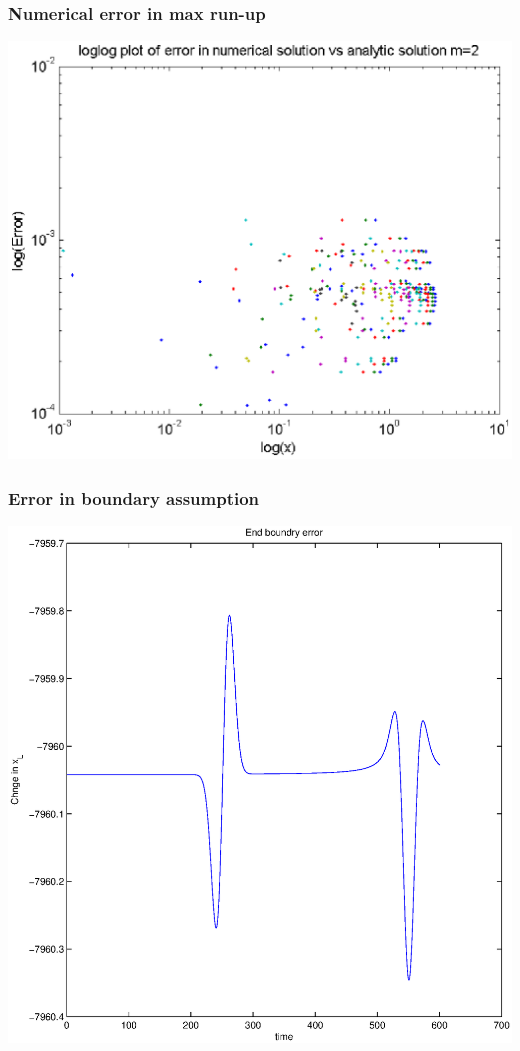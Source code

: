 	\begin{frame}
		\frametitle{Numerical error in max run-up}
		\includegraphics[width=\textwidth]{Error.eps}
		
	\end{frame}
	
	
	\begin{frame}
		\frametitle{Error in boundary assumption}
		\centering
		\includegraphics[width=.7\textwidth]{x_l.eps}
		
	\end{frame}
	
	
	
